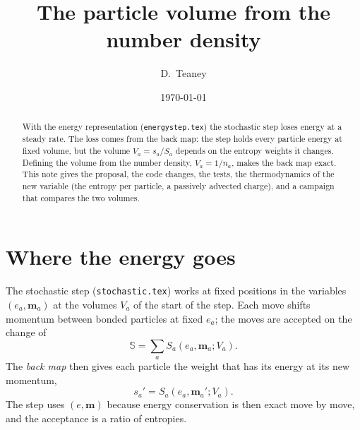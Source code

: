 \documentclass[11pt,aps,preprint,nofootinbib,superscriptaddress,tightenlines]{revtex4-2}
\def\st{\begin{equation}}
\def\stp{\end{equation}}
\begin{document}
\title{The particle volume from the number density}
\author{D.~Teaney}
\date{\today}

\begin{abstract}
With the energy representation (\texttt{energystep.tex}) the stochastic step loses energy
at a steady rate.  The loss comes from the back map: the step holds every particle energy
at fixed volume, but the volume $V_a=s_a/S_a$ depends on the entropy weights it changes.
Defining the volume from the number density, $V_a=1/n_a$, makes the back map exact.  This
note gives the proposal, the code changes, the tests, the thermodynamics of the new
variable (the entropy per particle, a passively advected charge), and a campaign that
compares the two volumes.
\end{abstract}

\maketitle

\section{Where the energy goes}
\label{sec:loss}

The stochastic step (\texttt{stochastic.tex}) works at fixed positions in the variables
$(e_a,\bm m_a)$ at the volumes $V_a$ of the start of the step.  Each move shifts momentum
between bonded particles at fixed $e_a$; the moves are accepted on the change of
\st
\mathbb S=\sum_aS_a(e_a,\bm m_a;V_a).
\stp
The \emph{back map} then gives each particle the weight that has its energy at its new
momentum,
\st
s_a'=S_a(e_a,\bm m_a';V_a).
\label{backmap}
\stp
The step uses $(e,\bm m)$ because energy conservation is then exact move by move, and the
acceptance is a ratio of entropies.
\end{document}
